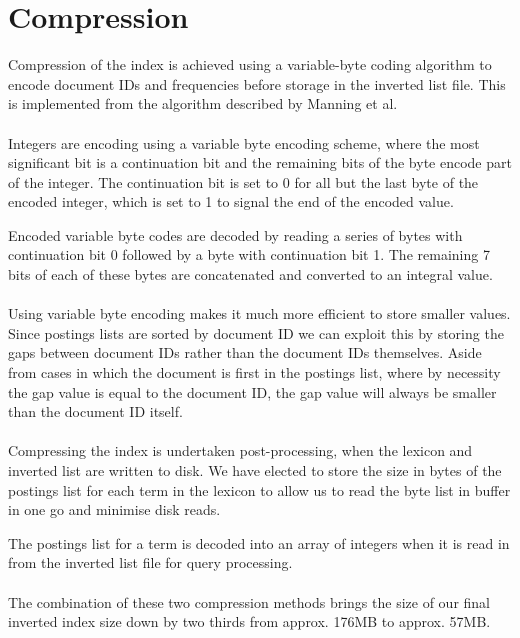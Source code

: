 
\section{Compression}
\label{sec:compression}

Compression of the index is achieved using a variable-byte coding algorithm to encode document IDs and frequencies before storage in the inverted list file. This is implemented from the algorithm described by Manning et al.\,\cite[p. 96-98]{manning2008introduction}

\paragraph{}
Integers are encoding using a variable byte encoding scheme, where the most significant bit is a continuation bit and the remaining bits of the byte encode part of the integer. The continuation bit is set to 0 for all but the last byte of the encoded integer, which is set to 1 to signal the end of the encoded value.

Encoded variable byte codes are decoded by reading a series of bytes with continuation bit 0 followed by a byte with continuation bit 1. The remaining 7 bits of each of these bytes are concatenated and converted to an integral value.

\paragraph{}
Using variable byte encoding makes it much more efficient to store smaller values. Since postings lists are sorted by document ID we can exploit this by storing the gaps between document IDs rather than the document IDs themselves. Aside from cases in which the document is first in the postings list, where by necessity the gap value is equal to the document ID, the gap value will always be smaller than the document ID itself.

\paragraph{}
Compressing the index is undertaken post-processing, when the lexicon and inverted list are written to disk. We have elected to store the size in bytes of the postings list for each term in the lexicon to allow us to read the byte list in buffer in one go and minimise disk reads.

The postings list for a term is decoded into an array of integers when it is read in from the inverted list file for query processing.

\paragraph{}
The combination of these two compression methods brings the size of our final inverted index size down by two thirds from approx. 176MB to approx. 57MB.
